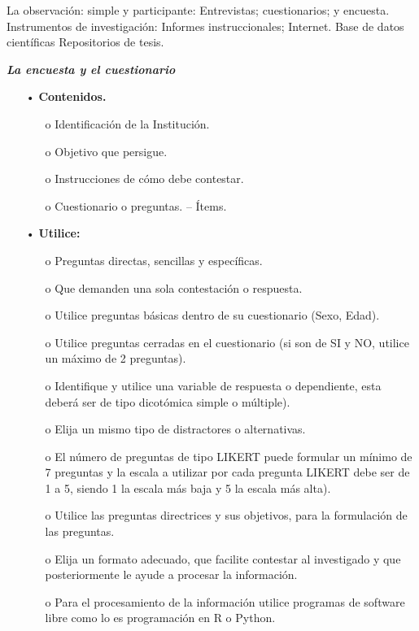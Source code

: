 \documentclass[12pt, a4paper, nofontenc, numbers=endperiod]{apa7}
\begin{document}
{{\begin{itemize}[leftmargin=2.90cm]
	\setlength{\parindent}{1.80cm}La observación: simple y participante: Entrevistas; cuestionarios; y encuesta. Instrumentos de investigación: Informes instruccionales; Internet. Base de datos científicas Repositorios de tesis.
\end{itemize}
}
\setlength{\parindent}{2.5cm}\textit{\textbf{La encuesta y el cuestionario}}
{\doublespacing
\begin{itemize}[leftmargin=2.90cm]
	\item[•] \textbf{Contenidos.} 
	\begin{itemize}[leftmargin=0.5cm]
		\item[o] Identificación de la Institución.
		\item[o] Objetivo que persigue.
		\item[o] Instrucciones de cómo debe contestar.
		\item[o] Cuestionario o preguntas. – Ítems.
	\end{itemize}
	
	\item[•] \textbf{Utilice:} 
	\begin{itemize}[leftmargin=0.5cm]
		\item[o] Preguntas directas, sencillas y específicas.
		\item[o] Que demanden una sola contestación o respuesta.
		\item[o] Utilice preguntas básicas dentro de su cuestionario (Sexo, Edad).
		\item[o] Utilice preguntas cerradas en el cuestionario (si son de SI y NO, utilice un máximo de 2 preguntas).
		\item[o] Identifique y utilice una variable de respuesta o dependiente, esta deberá ser de tipo dicotómica simple o múltiple).
		\item[o] Elija un mismo tipo de distractores o alternativas. 
		\item[o] El número de preguntas de tipo LIKERT puede formular un mínimo de 7 preguntas y la escala a utilizar por cada pregunta LIKERT debe ser de 1 a 5, siendo 1 la escala más baja y 5 la escala más alta). 
		\item[o] Utilice las preguntas directrices y sus objetivos, para la formulación de las preguntas. 
		\item[o] Elija un formato adecuado, que facilite contestar al investigado y que posteriormente le ayude a procesar la información.
		\item[o] Para el procesamiento de la información utilice programas de software libre como lo es programación en R o Python. 
	

\end{itemize}
\end{itemize}}}
\end{document}
